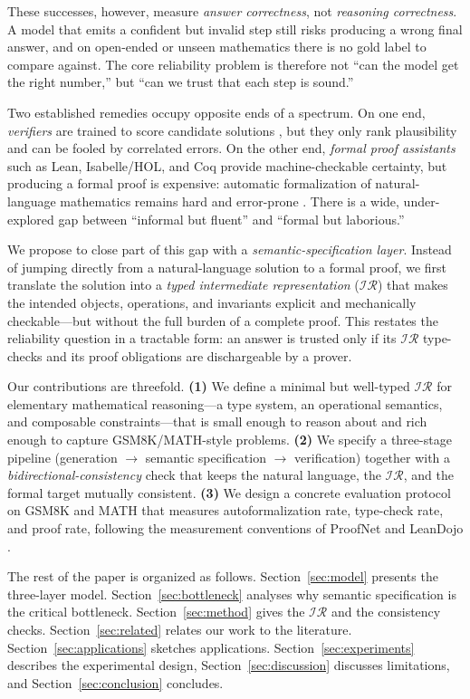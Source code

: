\documentclass[11pt]{article}
\newcommand{\IR}{\ensuremath{\mathcal{IR}}}
\begin{document}
These successes, however, measure \emph{answer correctness}, not
\emph{reasoning correctness}. A model that emits a confident but invalid step
still risks producing a wrong final answer, and on open-ended or unseen
mathematics there is no gold label to compare against. The core reliability
problem is therefore not ``can the model get the right number,'' but ``can we
trust that each step is sound.''

Two established remedies occupy opposite ends of a spectrum. On one end,
\emph{verifiers} are trained to score candidate solutions
\citep{cobbe2021training}, but they only rank plausibility and can be fooled by
correlated errors. On the other end, \emph{formal proof assistants} such as
Lean, Isabelle/HOL, and Coq provide machine-checkable certainty, but producing
a formal proof is expensive: automatic formalization of natural-language
mathematics remains hard and error-prone
\citep{wu2022autoformalization, azerbayev2023proofnet}. There is a wide,
under-explored gap between ``informal but fluent'' and ``formal but laborious.''

We propose to close part of this gap with a \emph{semantic-specification
layer}. Instead of jumping directly from a natural-language solution to a
formal proof, we first translate the solution into a \emph{typed intermediate
representation} (\IR{}) that makes the intended objects, operations, and
invariants explicit and mechanically checkable---but without the full burden of
a complete proof. This restates the reliability question in a tractable form:
an answer is trusted only if its \IR{} type-checks and its proof obligations
are dischargeable by a prover.

Our contributions are threefold. \textbf{(1)} We define a minimal but
well-typed \IR{} for elementary mathematical reasoning---a type system, an
operational semantics, and composable constraints---that is small enough to
reason about and rich enough to capture GSM8K/MATH-style problems.
\textbf{(2)} We specify a three-stage pipeline
(generation $\rightarrow$ semantic specification $\rightarrow$ verification)
together with a \emph{bidirectional-consistency} check that keeps the natural
language, the \IR{}, and the formal target mutually consistent. \textbf{(3)}
We design a concrete evaluation protocol on GSM8K and MATH that measures
autoformalization rate, type-check rate, and proof rate, following the
measurement conventions of ProofNet and LeanDojo
\citep{azerbayev2023proofnet, yang2023leandojo}.

The rest of the paper is organized as follows. Section~\ref{sec:model}
presents the three-layer model. Section~\ref{sec:bottleneck} analyses why
semantic specification is the critical bottleneck. Section~\ref{sec:method}
gives the \IR{} and the consistency checks. Section~\ref{sec:related} relates
our work to the literature. Section~\ref{sec:applications} sketches
applications. Section~\ref{sec:experiments} describes the experimental design,
Section~\ref{sec:discussion} discusses limitations, and
Section~\ref{sec:conclusion} concludes.
\end{document}
